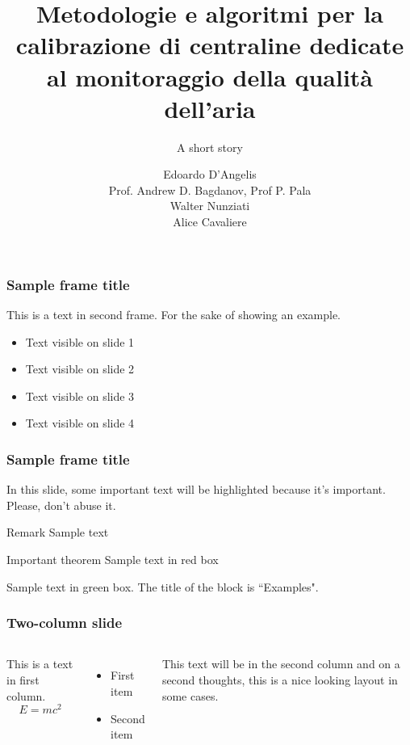 \documentclass{beamer}
\title[About Beamer] %
{Metodologie e algoritmi per la calibrazione di centraline dedicate al monitoraggio della qualità dell'aria}
\subtitle{A short story}
\author{Edoardo D'Angelis\\[3mm]Prof. Andrew D. Bagdanov, Prof P. Pala\\[3mm]Walter Nunziati\\[3mm]Alice Cavaliere}
\institute[UNIFI] %
{
  Università degli studi di Firenze\\
  Dipartimento di Ingegneria
}
\date{}
\begin{document}
\frame{\titlepage}

\begin{frame}
\frametitle{Sample frame title}
This is a text in second frame. 
For the sake of showing an example.

\begin{itemize}
 \item<1-> Text visible on slide 1
 \item<2-> Text visible on slide 2
 \item<3-> Text visible on slide 3
 \item<4-> Text visible on slide 4
\end{itemize}
\end{frame}

\begin{frame}
\frametitle{Sample frame title}

In this slide, some important text will be
\alert{highlighted} because it's important.
Please, don't abuse it.

\begin{block}{Remark}
Sample text
\end{block}

\begin{alertblock}{Important theorem}
Sample text in red box
\end{alertblock}

\begin{examples}
Sample text in green box. The title of the block is ``Examples".
\end{examples}
\end{frame}

\begin{frame}
\frametitle{Two-column slide}
\begin{columns}
This is a text in first column.
$$E=mc^2$$
\begin{itemize}
\item First item
\item Second item
\end{itemize}

This text will be in the second column
and on a second thoughts, this is a nice looking
layout in some cases.
\end{columns}
\end{frame}
\end{document}
